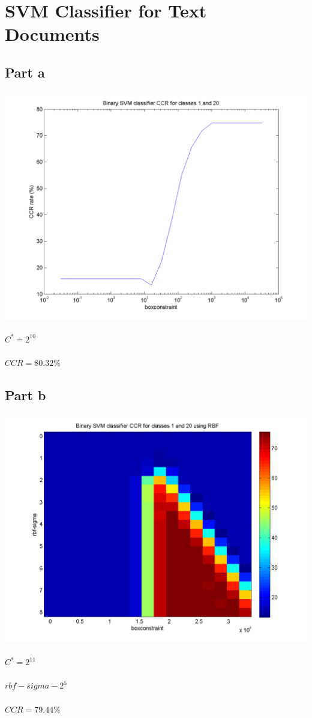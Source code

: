 \documentclass[paper=a4, fontsize=11pt]{scrartcl} %
\numberwithin{equation}{section} %
\numberwithin{figure}{section} %
\numberwithin{table}{section} %
\begin{document}
	
	
	\section{SVM Classifier for Text Documents}
	
	\subsection{Part a}
	\includegraphics[scale=.8]{part_a_CV_CCR}
	\\\\
	$C^* = 2^{10}$
	\\\\
	$CCR = 80.32\%$

	\subsection{Part b}
	\includegraphics[scale=.8]{part_b_CV_CCR}
	\\\\
	$C^* = 2^{11}$
	\\\\
	$rbf-sigma - 2^{5}$
	\\\\
	$CCR = 79.44\%$
		
\end{document}
